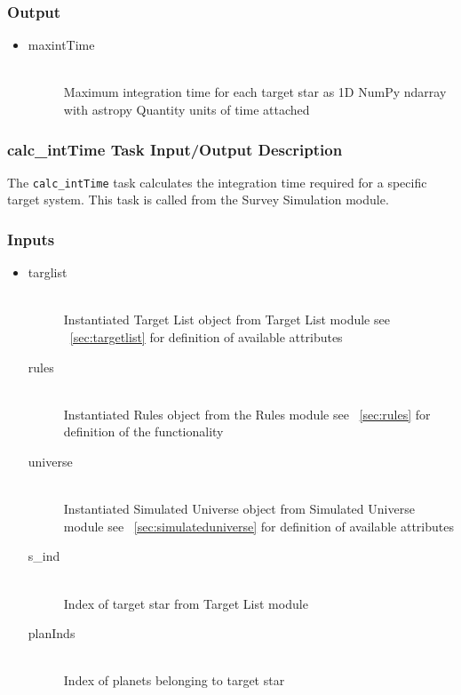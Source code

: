 \documentclass[cleanfoot]{asme2ej}
\begin{document}
\subsubsection*{Output}
\begin{itemize}
    \item
    \begin{description}
        \item[maxintTime] \hfill \\
        Maximum integration time for each target star as 1D NumPy ndarray with astropy Quantity units of time attached
    \end{description}
\end{itemize}

\subsubsection{calc\_intTime Task Input/Output Description} \label{sec:calcintTimetask}
The \verb+calc_intTime+ task calculates the integration time required for a specific target system.  This task is called from the Survey Simulation module.
\subsubsection*{Inputs}
\begin{itemize}
    \item 
    \begin{description}
        \item[targlist] \hfill \\
        Instantiated Target List object from Target List module see ~\ref{sec:targetlist} for definition of available attributes
        \item[rules] \hfill \\
        Instantiated Rules object from the Rules module see ~\ref{sec:rules} for definition of the functionality
        \item[universe] \hfill \\
        Instantiated Simulated Universe object from Simulated Universe module see ~\ref{sec:simulateduniverse} for definition of available attributes
        \item[s\_ind] \hfill \\
        Index of target star from Target List module
        \item[planInds] \hfill \\
        Index of planets belonging to target star
    \end{description}
\end{itemize}
\end{document}

